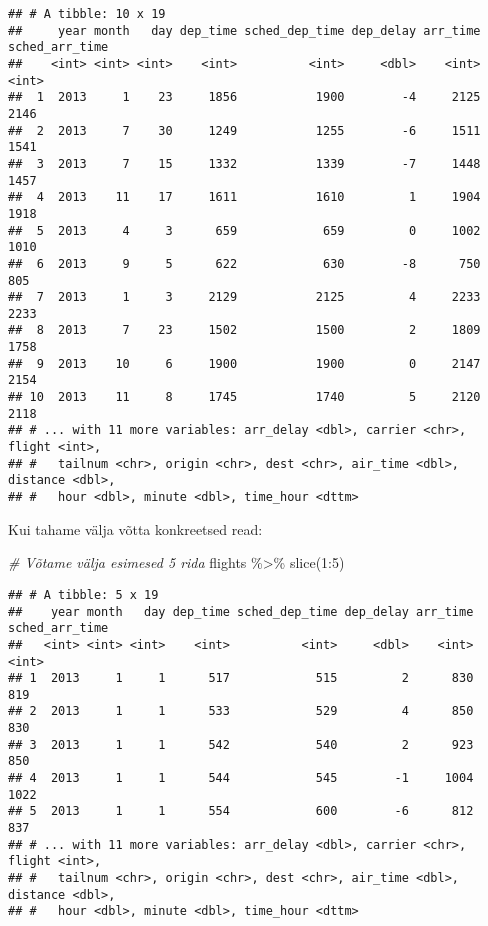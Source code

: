 \documentclass[
]{book}
\newenvironment{Shaded}{\begin{snugshade}}{\end{snugshade}}
\newcommand{\CommentTok}[1]{\textcolor[rgb]{0.56,0.35,0.01}{\textit{#1}}}
\newcommand{\DecValTok}[1]{\textcolor[rgb]{0.00,0.00,0.81}{#1}}
\newcommand{\FunctionTok}[1]{\textcolor[rgb]{0.00,0.00,0.00}{#1}}
\newcommand{\NormalTok}[1]{#1}
\newcommand{\SpecialCharTok}[1]{\textcolor[rgb]{0.00,0.00,0.00}{#1}}
\begin{document}
\begin{verbatim}
## # A tibble: 10 x 19
##     year month   day dep_time sched_dep_time dep_delay arr_time sched_arr_time
##    <int> <int> <int>    <int>          <int>     <dbl>    <int>          <int>
##  1  2013     1    23     1856           1900        -4     2125           2146
##  2  2013     7    30     1249           1255        -6     1511           1541
##  3  2013     7    15     1332           1339        -7     1448           1457
##  4  2013    11    17     1611           1610         1     1904           1918
##  5  2013     4     3      659            659         0     1002           1010
##  6  2013     9     5      622            630        -8      750            805
##  7  2013     1     3     2129           2125         4     2233           2233
##  8  2013     7    23     1502           1500         2     1809           1758
##  9  2013    10     6     1900           1900         0     2147           2154
## 10  2013    11     8     1745           1740         5     2120           2118
## # ... with 11 more variables: arr_delay <dbl>, carrier <chr>, flight <int>,
## #   tailnum <chr>, origin <chr>, dest <chr>, air_time <dbl>, distance <dbl>,
## #   hour <dbl>, minute <dbl>, time_hour <dttm>
\end{verbatim}

Kui tahame välja võtta konkreetsed read:

\begin{Shaded}
\begin{Highlighting}[]
\CommentTok{\# Võtame välja esimesed 5 rida}
\NormalTok{flights }\SpecialCharTok{\%\textgreater{}\%} 
  \FunctionTok{slice}\NormalTok{(}\DecValTok{1}\SpecialCharTok{:}\DecValTok{5}\NormalTok{)}
\end{Highlighting}
\end{Shaded}

\begin{verbatim}
## # A tibble: 5 x 19
##    year month   day dep_time sched_dep_time dep_delay arr_time sched_arr_time
##   <int> <int> <int>    <int>          <int>     <dbl>    <int>          <int>
## 1  2013     1     1      517            515         2      830            819
## 2  2013     1     1      533            529         4      850            830
## 3  2013     1     1      542            540         2      923            850
## 4  2013     1     1      544            545        -1     1004           1022
## 5  2013     1     1      554            600        -6      812            837
## # ... with 11 more variables: arr_delay <dbl>, carrier <chr>, flight <int>,
## #   tailnum <chr>, origin <chr>, dest <chr>, air_time <dbl>, distance <dbl>,
## #   hour <dbl>, minute <dbl>, time_hour <dttm>
\end{verbatim}
\end{document}
